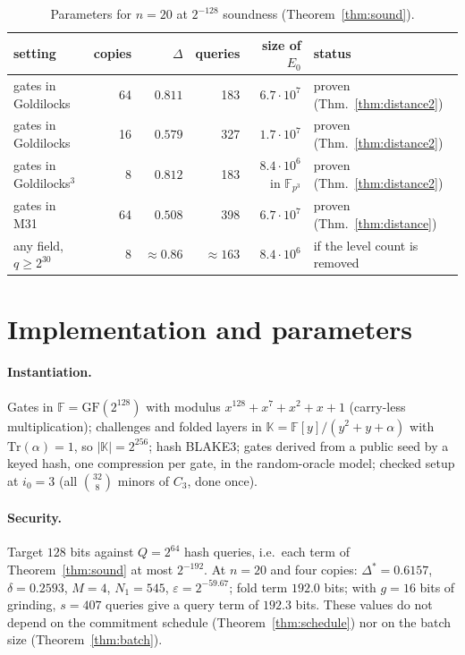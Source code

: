 \documentclass[11pt]{article}
\theoremstyle{definition}
\newcommand{\F}{\mathbb{F}}
\newcommand{\K}{\mathbb{K}}
\begin{document}
\begin{table}[h]
\centering
\begin{tabular}{lrrrrl}
\toprule
setting & copies & $\Delta$ & queries & size of $E_0$ & status\\
\midrule
gates in Goldilocks & 64 & $0.811$ & 183 & $6.7\cdot10^{7}$ & proven (Thm.~\ref{thm:distance2})\\
gates in Goldilocks & 16 & $0.579$ & 327 & $1.7\cdot10^{7}$ & proven (Thm.~\ref{thm:distance2})\\
gates in Goldilocks$^3$ & 8 & $0.812$ & 183 & $8.4\cdot10^{6}$ in $\F_{p^3}$ & proven (Thm.~\ref{thm:distance2})\\
gates in M31 & 64 & $0.508$ & 398 & $6.7\cdot10^{7}$ & proven (Thm.~\ref{thm:distance})\\
any field, $q\ge2^{30}$ & 8 & $\approx0.86$ & $\approx163$ & $8.4\cdot10^{6}$ & if the level count is removed\\
\bottomrule
\end{tabular}
\caption{Parameters for $n=20$ at $2^{-128}$ soundness (Theorem~\ref{thm:sound}).}
\end{table}



\section{Implementation and parameters}\label{sec:impl}

\paragraph{Instantiation.} Gates in $\F=\mathrm{GF}(2^{128})$ with modulus $x^{128}+x^7+x^2+x+1$ (carry-less
multiplication); challenges and folded layers in $\K=\F[y]/(y^2+y+\alpha)$ with $\mathrm{Tr}(\alpha)=1$, so
$|\K|=2^{256}$; hash BLAKE3; gates derived from a public seed by a keyed hash, one compression per gate, in the
random-oracle model; checked setup at $i_0=3$ (all $\binom{32}{8}$ minors of $C_3$, done once).

\paragraph{Security.} Target $128$ bits against $Q=2^{64}$ hash queries, i.e.\ each term of
Theorem~\ref{thm:sound} at most $2^{-192}$. At $n=20$ and four copies: $\Delta^{*}=0.6157$, $\delta=0.2593$,
$M=4$, $N_1=545$, $\varepsilon=2^{-59.67}$; fold term $192.0$ bits; with $g=16$ bits of grinding, $s=407$ queries
give a query term of $192.3$ bits. These values do not depend on the commitment schedule
(Theorem~\ref{thm:schedule}) nor on the batch size (Theorem~\ref{thm:batch}).
\end{document}
